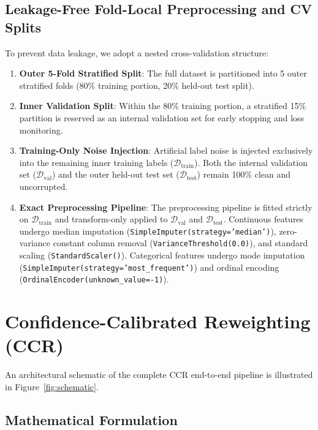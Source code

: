 \documentclass[preprint,12pt]{elsarticle}
\begin{document}
\subsection{Leakage-Free Fold-Local Preprocessing and CV Splits}
To prevent data leakage, we adopt a nested cross-validation structure:
\begin{enumerate}
    \item \textbf{Outer 5-Fold Stratified Split}: The full dataset is partitioned into 5 outer stratified folds (80\% training portion, 20\% held-out test split).
    \item \textbf{Inner Validation Split}: Within the 80\% training portion, a stratified 15\% partition is reserved as an internal validation set for early stopping and loss monitoring.
    \item \textbf{Training-Only Noise Injection}: Artificial label noise is injected exclusively into the remaining inner training labels ($\mathcal{D}_{\mathrm{train}}$). Both the internal validation set ($\mathcal{D}_{\mathrm{val}}$) and the outer held-out test set ($\mathcal{D}_{\mathrm{test}}$) remain 100\% clean and uncorrupted.
    \item \textbf{Exact Preprocessing Pipeline}: The preprocessing pipeline is fitted strictly on $\mathcal{D}_{\mathrm{train}}$ and transform-only applied to $\mathcal{D}_{\mathrm{val}}$ and $\mathcal{D}_{\mathrm{test}}$. Continuous features undergo median imputation (\texttt{SimpleImputer(strategy='median')}), zero-variance constant column removal (\texttt{VarianceThreshold(0.0)}), and standard scaling (\texttt{StandardScaler()}). Categorical features undergo mode imputation (\texttt{SimpleImputer(strategy='most\_frequent')}) and ordinal encoding (\texttt{OrdinalEncoder(unknown\_value=-1)}).
\end{enumerate}


\section{Confidence-Calibrated Reweighting (CCR)}
\label{sec:method}

An architectural schematic of the complete CCR end-to-end pipeline is illustrated in Figure~\ref{fig:schematic}.

\subsection{Mathematical Formulation}
\end{document}
